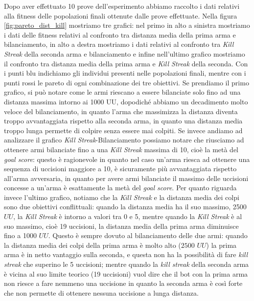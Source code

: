 \documentclass[12pt, italian]{toptesi}
\begin{document}
Dopo aver effettuato 10 prove dell'esperimento abbiamo raccolto i dati relativi alla fitness delle popolazioni finali ottenute dalle prove effettuate.
Nella figura \ref{fig:pareto_dist_kill} mostriamo tre grafici: nel primo in alto a sinistra mostriamo i dati delle fitness relativi al confronto tra distanza media della prima arma e bilanciamento, in alto a destra mostriamo i dati relativi al confronto tra \emph{Kill Streak} della seconda arma e bilanciamento e infine nell'ultimo grafico mostriamo il confronto tra distanza media della prima arma e \emph{Kill Streak} della seconda. Con i punti blu indichiamo gli individui presenti nelle popolazioni finali, mentre con i punti rossi le pareto di ogni combinazione dei tre obiettivi.
Se prendiamo il primo grafico, si può notare come le armi riescano a essere bilanciate solo fino ad una distanza massima intorno ai 1000 UU, dopodiché abbiamo un decadimento molto veloce del bilanciamento, in quanto l'arma che massimizza la distanza diventa troppo avvantaggiata rispetto alla seconda arma, in quanto una distanza media troppo lunga permette di colpire senza essere mai colpiti. 
Se invece andiamo ad analizzare il grafico \emph{Kill Streak}-Bilanciamento possiamo notare che riusciamo ad ottenere armi bilanciate fino a una \emph{Kill Streak} massima di 10, cioè la metà del \emph{goal score}: questo è ragionevole in quanto nel caso un'arma riesca ad ottenere una sequenza di uccisioni maggiore a 10, è sicuramente più avvantaggiata rispetto all'arma avversaria, in quanto per avere armi bilanciate il massimo delle uccisioni concesse a un'arma è esattamente la metà del \emph{goal score}.
Per quanto riguarda invece l'ultimo grafico, notiamo che la \emph{Kill Streak} e la distanza media dei colpi sono due obiettivi conflittuali: quando la distanza media ha il suo massimo, 2500 $UU$, la \emph{Kill Streak} è intorno a valori tra 0 e 5, mentre quando la \emph{Kill Streak} è al suo massimo, cioè 19 uccisioni, la distanza media della prima arma diminuisce fino a 1000 $UU$. Questo è sempre dovuto al bilanciamento delle due armi: quando la distanza media dei colpi della prima arma è molto alto ($2500$ $UU$) la prima arma è in netto vantaggio sulla seconda, e questa non ha la possibilità di fare \emph{kill streak} che superino le 5 uccisioni; mentre quando la \emph{kill streak} della seconda arma è vicina al suo limite teorico (19 uccisioni) vuol dire che il bot con la prima arma non riesce a fare nemmeno una uccisione in quanto la seconda arma è così forte che non permette di ottenere nessuna uccisione a lunga distanza.
\end{document}
